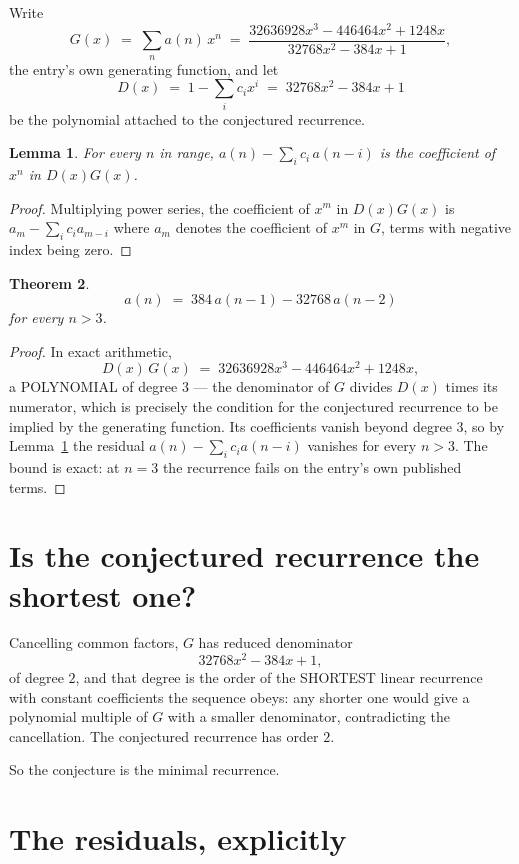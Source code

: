 \documentclass[11pt,a4paper]{article}
\theoremstyle{plain}
\newtheorem{theorem}{Theorem}
\newtheorem{lemma}[theorem]{Lemma}
\theoremstyle{definition}
\begin{document}
Write
\[
G(x)\;=\;\sum_{n}a(n)\,x^{n}\;=\;\frac{32636928 x^{3} - 446464 x^{2} + 1248 x}{32768 x^{2} - 384 x + 1},
\]
the entry's own generating function, and let
\[
D(x)\;=\;1-\sum_i c_i x^{i}\;=\;32768 x^{2} - 384 x + 1
\]
be the polynomial attached to the conjectured recurrence.

\begin{lemma}\label{lem:key}
For every $n$ in range, $a(n)-\sum_i c_i\,a(n-i)$ is the coefficient of $x^{n}$ in
$D(x)G(x)$.
\end{lemma}

\begin{proof}
Multiplying power series, the coefficient of $x^{m}$ in $D(x)G(x)$ is
$a_m-\sum_i c_i a_{m-i}$ where $a_m$ denotes the coefficient of $x^{m}$ in $G$, terms with
negative index being zero.
\end{proof}

\begin{theorem}
\[
a(n)\;=\;384\,a(n-1) - 32768\,a(n-2)
\]
for every $n>3$.
\end{theorem}

\begin{proof}
In exact arithmetic,
\[
D(x)\,G(x)\;=\;32636928 x^{3} - 446464 x^{2} + 1248 x,
\]
a POLYNOMIAL of degree $3$ --- the denominator of $G$ divides $D(x)$ times its numerator,
which is precisely the condition for the conjectured recurrence to be implied by the
generating function. Its coefficients vanish beyond degree $3$, so by
Lemma~\ref{lem:key} the residual $a(n)-\sum_ic_ia(n-i)$ vanishes for every
$n>3$. The bound is exact: at $n=3$ the recurrence fails on the entry's own published terms.
\end{proof}

\section{Is the conjectured recurrence the shortest one?}

Cancelling common factors, $G$ has reduced denominator
\[
32768 x^{2} - 384 x + 1,
\]
of degree $2$, and that degree is the order of the SHORTEST linear recurrence with
constant coefficients the sequence obeys: any shorter one would give a polynomial multiple of
$G$ with a smaller denominator, contradicting the cancellation. The conjectured recurrence has
order $2$.

So the conjecture is the minimal recurrence.

\section{The residuals, explicitly}
\end{document}
